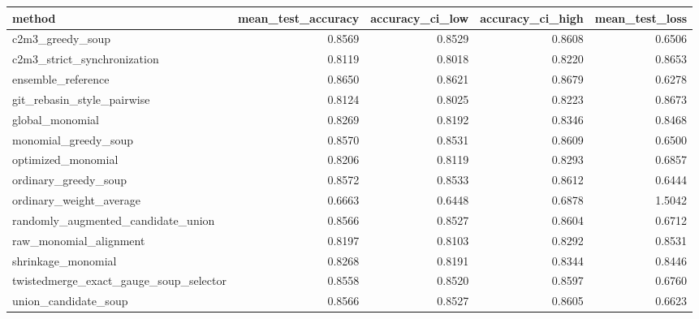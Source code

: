 \begin{tabular}{lrrrr}
\toprule
method & mean\_test\_accuracy & accuracy\_ci\_low & accuracy\_ci\_high & mean\_test\_loss \\
\midrule
c2m3\_greedy\_soup & 0.8569 & 0.8529 & 0.8608 & 0.6506 \\
c2m3\_strict\_synchronization & 0.8119 & 0.8018 & 0.8220 & 0.8653 \\
ensemble\_reference & 0.8650 & 0.8621 & 0.8679 & 0.6278 \\
git\_rebasin\_style\_pairwise & 0.8124 & 0.8025 & 0.8223 & 0.8673 \\
global\_monomial & 0.8269 & 0.8192 & 0.8346 & 0.8468 \\
monomial\_greedy\_soup & 0.8570 & 0.8531 & 0.8609 & 0.6500 \\
optimized\_monomial & 0.8206 & 0.8119 & 0.8293 & 0.6857 \\
ordinary\_greedy\_soup & 0.8572 & 0.8533 & 0.8612 & 0.6444 \\
ordinary\_weight\_average & 0.6663 & 0.6448 & 0.6878 & 1.5042 \\
randomly\_augmented\_candidate\_union & 0.8566 & 0.8527 & 0.8604 & 0.6712 \\
raw\_monomial\_alignment & 0.8197 & 0.8103 & 0.8292 & 0.8531 \\
shrinkage\_monomial & 0.8268 & 0.8191 & 0.8344 & 0.8446 \\
twistedmerge\_exact\_gauge\_soup\_selector & 0.8558 & 0.8520 & 0.8597 & 0.6760 \\
union\_candidate\_soup & 0.8566 & 0.8527 & 0.8605 & 0.6623 \\
\bottomrule
\end{tabular}
